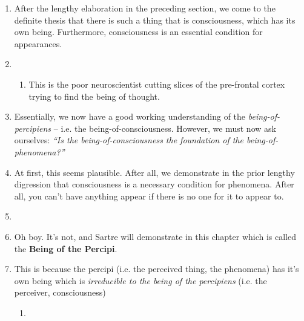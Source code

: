 \begin{enumerate}
  \item After the lengthy elaboration in the preceding section, we come to the definite thesis that there is such a thing that is consciousness, which has its own being. Furthermore, consciousness is an essential condition for appearances.
  \item {}
  \begin{enumerate}
    \item This is the poor neuroscientist cutting slices of the pre-frontal cortex trying to find the being of thought.
  \end{enumerate}
  \item Essentially, we now have a good working understanding of the \emph{being-of-percipiens} -- i.e. the being-of-consciousness. However, we must now ask ourselves: \emph{\enquote{Is the being-of-consciousness the foundation of the being-of-phenomena?}}
  \item At first, this seems plausible. After all, we demonstrate in the prior lengthy digression that consciousness is a necessary condition for phenomena. After all, you can't have anything appear if there is no one for it to appear to.
  \item {}
  \item Oh boy. It's not, and Sartre will demonstrate in this chapter which is called the \textbf{Being of the Percipi}.
  \item This is because the percipi (i.e. the perceived thing, the phenomena) has it's own being which is \emph{irreducible to the being of the percipiens} (i.e. the perceiver, consciousness)
  \begin{enumerate}
    \item {}
  \end{enumerate}
\end{enumerate}

